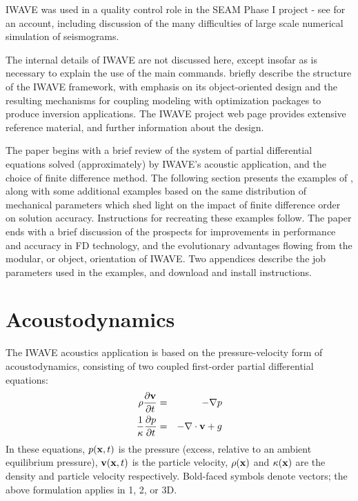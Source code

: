 IWAVE was used in a quality control role in the SEAM Phase I project -
see \cite{FehlerKeliher:2011} for an account, including discussion of
the many difficulties of large scale numerical simulation of seismograms.

The internal details of IWAVE are not discussed here, except insofar
as is necessary to explain the use of the main
commands. \cite{GeoPros:11} briefly describe the structure of the
IWAVE framework, with emphasis on its object-oriented design and the
resulting mechanisms for coupling modeling with optimization packages
to produce inversion applications. The IWAVE project web page \cite[]{IWAVE}
provides extensive reference material, and further information about
the design.

The paper begins with a brief review of the system of partial
differential equations solved (approximately) by IWAVE's acoustic
application, and the choice of finite difference method. The following
section presents the examples of
\cite{SymesVdovina:09}, along with some additional examples based on
the same distribution of mechanical parameters which shed light on the
impact of finite difference order on solution accuracy. Instructions
for recreating these examples follow. The paper ends with a brief
discussion of the prospects for improvements in performance and
accuracy in FD technology, and the evolutionary advantages flowing from the
modular, or object, orientation of IWAVE. Two appendices describe the
job parameters used in the examples, and download and install instructions.
 
\section{Acoustodynamics}
The IWAVE acoustics application is based on the pressure-velocity form of
acoustodynamics, consisting of two coupled first-order partial
differential equations:
\begin{eqnarray}
\label{awe}
\rho \frac{\partial {\bf v}}{\partial t} &=& - \nabla p \\
\frac{1}{\kappa}\frac{\partial p}{\partial t} &=& -\nabla \cdot {\bf v} + g
\end{eqnarray}
In these equations, $p({\bf x},t)$ is the pressure (excess, relative to an
ambient equilibrium pressure), ${\bf v}({\bf x},t)$ is the particle velocity,
$\rho({\bf x})$ and $\kappa({\bf x})$ are the density and particle velocity
respectively. Bold-faced symbols denote vectors; the above formulation
applies in 1, 2, or 3D.

